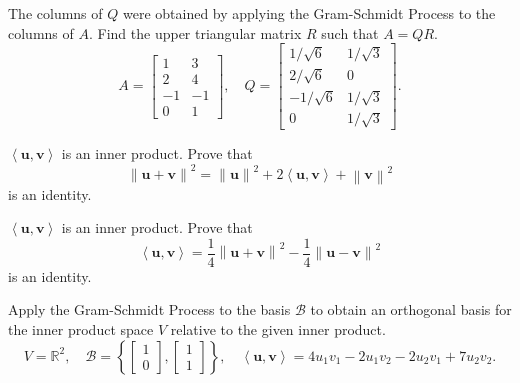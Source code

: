 \documentclass[11pt,letterpaper,boxed]{hmcpset}
\newcommand{\R}{\mathbb{R}}
\newcommand{\crb}[1]{\left\{ #1 \right\}}
\newcommand{\lra}[1]{\left\langle #1 \right\rangle}
\newcommand{\magn}[1]{\left\lVert #1 \right\rVert}
\newcommand{\VEC}[1]{\ensuremath{\mathbf{#1}}\xspace}
\begin{document}
\begin{problem}[Poole 5.3 \#18]
The columns of $Q$ were obtained by applying the Gram-Schmidt Process to the columns of $A$. Find the upper triangular matrix $R$ such that $A = QR$.
\[
	A = \begin{bmatrix}1 & 3\\2 & 4\\-1 & -1 \\ 	0 & 1\end{bmatrix}, \quad Q = \begin{bmatrix}1 / \sqrt{6} & 1 / \sqrt{3} \\ 2 / \sqrt{6} & 0 \\  -1/\sqrt{6} & 1 / \sqrt{3} \\ 0 & 1 / \sqrt{3}\end{bmatrix}.
\]
\end{problem}

\begin{solution}
\vfill
\end{solution}
\newpage

\begin{problem}[Poole 7.1 \#32]
$\lra{\VEC{u},\VEC{v}}$ is an inner product. Prove that
\[
	\magn{\VEC{u}+\VEC{v}}^2 = \magn{\VEC{u}}^2 + 2\lra{\VEC{u},\VEC{v}} + \magn{\VEC{v}}^2
\]
is an identity.
\end{problem}

\begin{solution}
\vfill
\end{solution}
\newpage

\begin{problem}[Poole 7.1 \#34]
$\lra{\VEC{u},\VEC{v}}$ is an inner product. Prove that
\[
	\lra{\VEC{u},\VEC{v}} = \frac{1}{4}\magn{\VEC{u}+\VEC{v}}^2 - \frac{1}{4}\magn{\VEC{u}-\VEC{v}}^2
\]
is an identity.
\end{problem}

\begin{solution}
\vfill
\end{solution}
\newpage

\begin{problem}[Poole 7.1 \#38]
Apply the Gram-Schmidt Process to the basis $\mathcal{B}$ to obtain an orthogonal basis for the inner product space $V$ relative to the given inner product.
\[
	V = \R^2, \quad \mathcal{B} = \crb{\begin{bmatrix}1\\0\end{bmatrix},\begin{bmatrix}1\\1\end{bmatrix}}, \quad \lra{\VEC{u},\VEC{v}} = 4u_1v_1-2u_1v_2-2u_2v_1+7u_2v_2.
\]
\end{problem}
\end{document}
